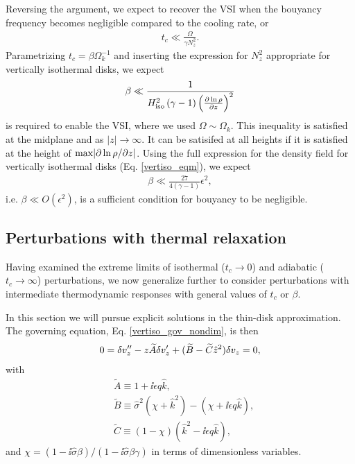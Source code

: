 Reversing the argument, we expect to recover the VSI when the bouyancy
frequency becomes negligible compared to the cooling rate, or 
\begin{align}
  t_c \ll \frac{\Omega}{\gamma N_z^2}. 
\end{align} 
Parametrizing $t_c = \beta\Omega_k^{-1}$ and inserting the expression
for $N_z^2$ appropriate for vertically isothermal disks, we expect
\begin{align}
  \beta \ll
  \frac{1}{H^2_\mathrm{iso}\left(\gamma-1\right)\left(\frac{\partial\ln\rho}{\partial
          z}\right)^2} 
\end{align}
is required to enable the VSI, where we used $\Omega\sim\Omega_k$.  
This inequality is satisfied at the
midplane and as $|z|\to\infty$. It can be satisifed at all heights if
it is satisfied at the height of $\mathrm{max}|\partial\ln\rho/\partial z|$. 
Using the full expression for the density field for vertically isothermal
disks (Eq. \ref{vertiso_eqm}), we expect 
\begin{align}
  \beta \ll \frac{27}{4(\gamma-1)}\epsilon^2,
\end{align}
i.e. $\beta\ll O(\epsilon^2)$, is a sufficient condition for
bouyancy to be negligible.  


\subsection{Perturbations with thermal relaxation}
Having examined the extreme limits of isothermal ($t_c\to0$) and
adiabatic ($t_c\to\infty$) perturbations, we now generalize further to consider
perturbations with intermediate thermodynamic responses with general
values of $t_c$ or $\beta$.  

In this section we will pursue explicit solutions in the thin-disk
approximation. The governing equation, Eq. \ref{vertiso_gov_nondim}, is
then 
\begin{align}
  0 = \delta v_z^{\prime\prime} - z \widetilde{A}\delta v_z^\prime +
  (\widetilde{B} - \widetilde{C}\hat{z}^2)\delta v_z = 0,\label{nearly_iso_explicit}
\end{align}
with
\begin{align}
  &\widetilde{A} \equiv 1 + \ii \epsilon q \hat{k},\\
  &\widetilde{B} \equiv \hat{\sigma}^2\left(\chi + \hat{k}^2\right) -
  \left(\chi + \ii \epsilon q \hat{k}\right),\\
  &\widetilde{C} \equiv \left(1-\chi\right)\left(\hat{k}^2 - \ii
      \epsilon q\hat{k}\right), 
\end{align}
and $\chi =
\left(1-\ii\hat{\sigma}\beta\right)/\left(1-\ii\hat{\sigma}\beta\gamma\right)
$ in terms of dimensionless variables.  


